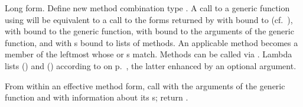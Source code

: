 \begin{LIST}{1cm}
  {
  Long form. Define new method combination type
  . A call to a generic function using
   will be equivalent to a call to the forms returned by
   with  bound to
   (cf.\ ), with  bound to
  the generic function, with 
  bound to the arguments of the generic function, and with
  s bound to lists of methods. An applicable method becomes
  a member of the leftmost  whose  or
  s match. Methods can be called via
  . Lambda lists () and
  () according to
   on p.\ \pageref{section:Functions}, the latter
  enhanced by an optional  argument.
  }

  {
  From within an effective method form, call  with the
  arguments of the generic function and
  with information about its s; return . 
  }

\end{LIST}



